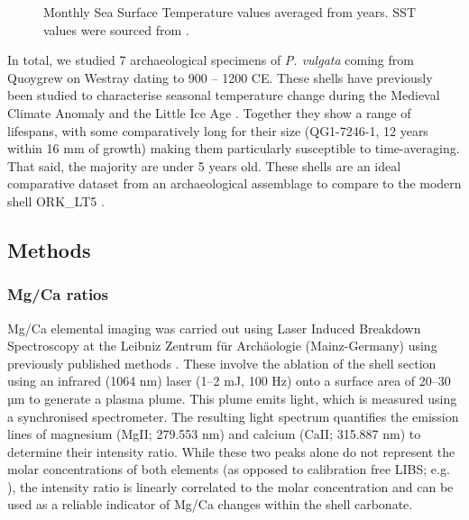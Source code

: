 \documentclass[
  authoryear,
  preprint,
  3p]{elsarticle}
\begin{document}
\begin{figure}[H]


\caption{\label{fig-SSTs}Monthly Sea Surface Temperature values averaged
from years. SST values were sourced from \citet{Good2020-nl}.}

\end{figure}%

In total, we studied 7 archaeological specimens of \emph{P. vulgata}
coming from Quoygrew on Westray dating to 900 -- 1200 CE. These shells
have previously been studied to characterise seasonal temperature change
during the Medieval Climate Anomaly and the Little Ice Age
\citep{Surge2012-ba}. Together they show a range of lifespans, with some
comparatively long for their size (QG1-7246-1, 12 years within 16 mm of
growth) making them particularly susceptible to time-averaging. That
said, the majority are under 5 years old. These shells are an ideal
comparative dataset from an archaeological assemblage to compare to the
modern shell ORK\_LT5 \citep{Graniero2017-io}.

\subsection{Methods}\label{methods}

\subsubsection{Mg/Ca ratios}\label{mgca-ratios}

Mg/Ca elemental imaging was carried out using Laser Induced Breakdown
Spectroscopy at the Leibniz Zentrum für Archäologie (Mainz-Germany)
using previously published methods \citep{Hausmann2023-ih}. These
involve the ablation of the shell section using an infrared (1064 nm)
laser (1--2 mJ, 100 Hz) onto a surface area of 20--30 µm to generate a
plasma plume. This plume emits light, which is measured using a
synchronised spectrometer. The resulting light spectrum quantifies the
emission lines of magnesium (MgII; 279.553 nm) and calcium (CaII;
315.887 nm) to determine their intensity ratio. While these two peaks
alone do not represent the molar concentrations of both elements (as
opposed to calibration free LIBS; e.g.
\citep{Martinez-Minchero2022-jz}), the intensity ratio is linearly
correlated to the molar concentration \citep{Hausmann2017-oa} and can be
used as a reliable indicator of Mg/Ca changes within the shell
carbonate.
\end{document}
